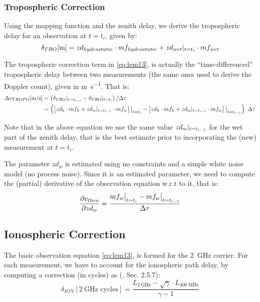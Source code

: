 \subsubsection{Tropospheric Correction}
Using the mapping function and the zenith delay, we derive the tropospheric 
delay for an observation at $t=t_i$, given by:
\begin{equation}
  \delta _{TRO} [\si{\m}] = zd_{hydrostatic} \cdot mf_{hydrostatic} + zd_{wet}\at{t=t_i} \cdot mf_{wet}
  \label{eq:tropo-delay}
\end{equation}

The tropospheric correction term in \ref{eq:lem13}, is actually the ``time-differenced'' 
tropospheric delay between two measurements (the same ones used to derive the 
Doppler count), given in \si{\m \per \s}. That is:
\begin{equation}
  \begin{aligned}
    \Delta v_{TROPO} [\si{\m \per \s}] 
      &= \left( \delta _{TRO} \at{t=t_{i-1}} - \delta _{TRO} \at{t=t_{i}} \right) / \Delta \tau\\
      &= \left( \left[ zd_{h} \cdot mf_{h} + zd_{w}\at{t=t_{i-1}} \cdot mf_{w} \right]\at[\big]{t=t_i} - 
        \left[ zd_{h} \cdot mf_{h} + zd_{w}\at{t=t_{i-1}} \cdot mf_{w} \right]\at[\big]{t=t_{i-1}} \right) \ \Delta \tau
    \label{eq:dtrop-diff}
  \end{aligned}
\end{equation}

Note that in the above equation we use the same value $zd_{w}|_{t=t_{i-1}}$ 
for the wet part of the zenith delay, that is the best estimate prior to 
incorporating the (new) measurement at $t=t_i$.

The parameter $zd_{w}$ is estimated using no constraints and a simple white 
noise model (no process noise). Since it is an estimated parameter, we need 
to compute the (partial) derivative of the observation equation w.r.t to it, 
that is:
\begin{equation}
  \frac{\partial v_{theo}}{\partial zd_{w}} = \frac{mf_{w}\at[\big]{t=t_i} 
    - mf_{w}\at[\big]{t=t_{i-1}}}{\Delta \tau}
  \label{eq:partials-zwd}
\end{equation}

\subsection{Ionospheric Correction}
\label{ssec:iono-correction}
The basic observation equation \ref{eq:lem13}, is formed for the \SI{2}{\GHz} 
carrier. For each measurement, we have to account for the ionospheric path 
delay, by computing a correction (in cycles) as (\cite{lemoine-2016}, Sec. 2.5.7):
\begin{equation}
  \delta_{ION} [\SI{2}{\GHz}\text{ cycles}] = 
    \frac{L_{\SI{2}{\GHz}} - \sqrt{\gamma} \cdot L_{\SI{400}{\MHz}}}{\gamma - 1}
  \label{eq:iono-delay-cycles}
\end{equation}

